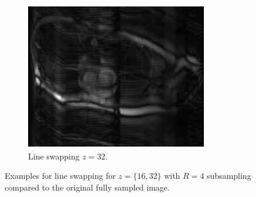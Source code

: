 \begin{figure}[h]
\begin{subfigure}{0.325\textwidth}
	\end{subfigure}
	\hfill
	\begin{subfigure}{0.325\textwidth}
    		\includegraphics[width=\textwidth]{./Images/LineSwapping32.png}
    		\caption{Line swapping $z=32$.}
    		\label{fig:LineSwapping32}
	\end{subfigure}
	\caption{Examples for line swapping for $z=\{16,32\}$ with $R=4$ subsampling compared to the original fully sampled image.}
	\label{fig:LineSwapping}
\end{figure}


